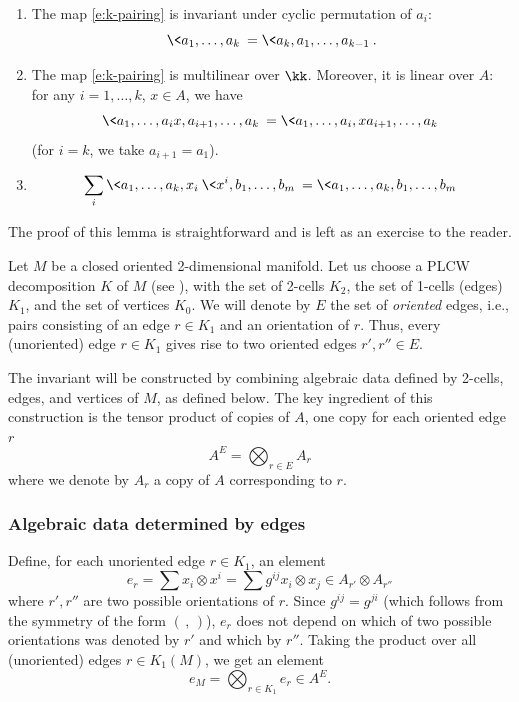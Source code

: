 \begin{lemma}\label{l:k-pairing}
  \par\noindent
  \begin{enumerate}
    \item The map \eqref{e:k-pairing} is invariant under cyclic permutation of
      $a_i$:
      $$
      \< a_1, \dots, a_k\> = \<a_k, a_1, \dots, a_{k-1}\>.
      $$
    \item The map \eqref{e:k-pairing} is multilinear over $\kk$. Moreover, it is
      linear over $A$: for any $i=1,\dots, k$, $x\in A$, we have
      $$
        \< a_1, \dots, a_ix, a_{i+1},\dots, a_k\> =
        \< a_1, \dots, a_i, xa_{i+1},\dots, a_k\>
      $$
      \textup{(}for $i=k$, we take $a_{i+1}=a_1$\textup{)}.
    \item
      \begin{equation}\label{e:k-pairing-2}
        \sum_i \< a_1, \dots, a_k, x_i\> \< x^i, b_1, \dots, b_m\>
         =\< a_1, \dots, a_k, b_1, \dots, b_m\>
      \end{equation}
  \end{enumerate}
\end{lemma}
The proof of this lemma is straightforward and is left as an exercise to
the reader.

Let $M$ be a closed oriented 2-dimensional manifold. Let us choose a PLCW
decomposition $K$ of $M$ (see ), with the set of 2-cells $K_2$,
the set of 1-cells (edges) $K_1$, and the set of vertices $K_0$. We will denote
by $E$ the set of \emph{oriented} edges, i.e., pairs consisting of an edge $r\in
K_1$ and an orientation of $r$. Thus, every (unoriented) edge $r\in K_1$ gives
rise to two oriented edges $r', r''\in E$.

The invariant will be constructed by combining algebraic data defined by
2-cells, edges, and vertices of $M$, as defined below. The key ingredient of
this construction is the tensor product of copies of $A$, one copy for
each oriented edge $r$
\begin{equation}\label{e:AE}
  A^E = \bigotimes_{r\in E}A_r
\end{equation}
where we denote by $A_r$ a copy of $A$ corresponding
to $r$.

\subsubsection*{\textbf{Algebraic data determined by edges}}
Define, for each unoriented edge $r\in K_1$, an element
\begin{equation}\label{e:er}
 e_r = \sum x_i\otimes x^i
     =\sum g^{ij} x_i \otimes x_j\in A_{r'}\otimes A_{r''}
\end{equation}
where $r', r''$ are two possible orientations of $r$. Since $g^{ij}=g^{ji}$
(which follows from the symmetry of the form $(\, , \,)$), $e_r$ does not
depend on which of two possible orientations was denoted by $r'$ and which
by $r''$. Taking the product over all (unoriented) edges $r\in K_1(M)$, we
get an element
\begin{equation}\label{e:eM}
  e_M = \bigotimes_{r\in K_1} e_r\in A^E.
\end{equation}

